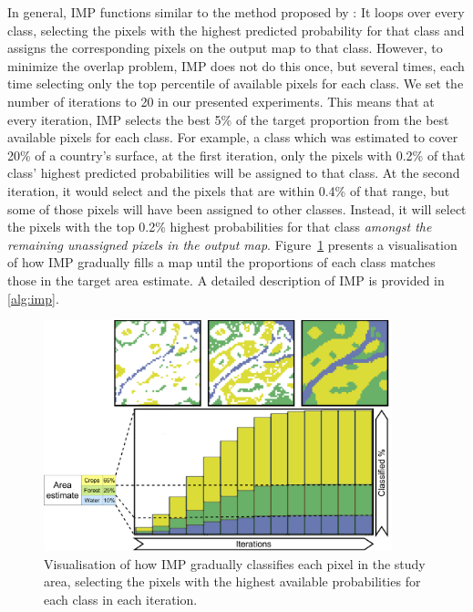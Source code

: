     In general, IMP functions similar to the method proposed by \citet{horvath2021comparison}: It loops over every class, selecting the pixels with the highest predicted probability for that class and assigns the corresponding pixels on the output map to that class. However, to minimize the overlap problem, IMP does not do this once, but several times, each time selecting only the top percentile of available pixels for each class. We set the number of iterations to 20 in our presented experiments. This means that at every iteration, IMP selects the best 5\% of the target proportion from the best available pixels for each class.
    For example, a class which was estimated to cover 20\% of a country's surface, at the first iteration, only the pixels with 0.2\% of that class' highest predicted probabilities will be assigned to that class. At the second iteration, it would select and the pixels that are within 0.4\% of that range, but some of those pixels will have been assigned to other classes. Instead, it will select the pixels with the top 0.2\% highest probabilities for that class \textit{amongst the remaining unassigned pixels in the output map}. Figure~\ref{fig:imp} presents a visualisation of how IMP gradually fills a map until the proportions of each class matches those in the target area estimate. A detailed description of IMP is provided in \ref{alg:imp}.

    \begin{figure}[H]
        \centering
        \includegraphics[width=0.9\textwidth]{figs_04/fig3_imp.pdf}
        \caption{Visualisation of how IMP gradually classifies each pixel in the study area, selecting the pixels with the highest available probabilities for each class in each iteration.}
        \label{fig:imp}
    \end{figure}

